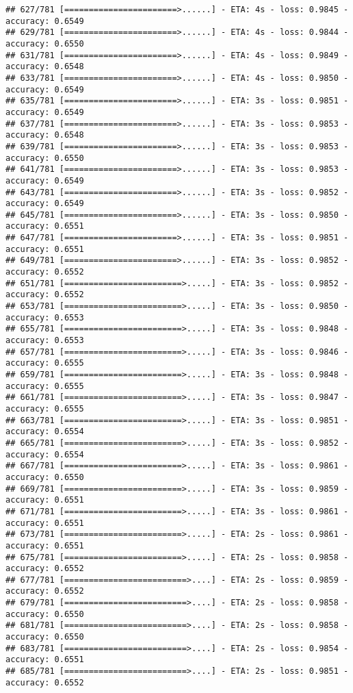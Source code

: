 \documentclass[
]{article}
\begin{document}
\begin{verbatim}
## 627/781 [=======================>......] - ETA: 4s - loss: 0.9845 - accuracy: 0.6549
## 629/781 [=======================>......] - ETA: 4s - loss: 0.9844 - accuracy: 0.6550
## 631/781 [=======================>......] - ETA: 4s - loss: 0.9849 - accuracy: 0.6548
## 633/781 [=======================>......] - ETA: 4s - loss: 0.9850 - accuracy: 0.6549
## 635/781 [=======================>......] - ETA: 3s - loss: 0.9851 - accuracy: 0.6549
## 637/781 [=======================>......] - ETA: 3s - loss: 0.9853 - accuracy: 0.6548
## 639/781 [=======================>......] - ETA: 3s - loss: 0.9853 - accuracy: 0.6550
## 641/781 [=======================>......] - ETA: 3s - loss: 0.9853 - accuracy: 0.6549
## 643/781 [=======================>......] - ETA: 3s - loss: 0.9852 - accuracy: 0.6549
## 645/781 [=======================>......] - ETA: 3s - loss: 0.9850 - accuracy: 0.6551
## 647/781 [=======================>......] - ETA: 3s - loss: 0.9851 - accuracy: 0.6551
## 649/781 [=======================>......] - ETA: 3s - loss: 0.9852 - accuracy: 0.6552
## 651/781 [========================>.....] - ETA: 3s - loss: 0.9852 - accuracy: 0.6552
## 653/781 [========================>.....] - ETA: 3s - loss: 0.9850 - accuracy: 0.6553
## 655/781 [========================>.....] - ETA: 3s - loss: 0.9848 - accuracy: 0.6553
## 657/781 [========================>.....] - ETA: 3s - loss: 0.9846 - accuracy: 0.6555
## 659/781 [========================>.....] - ETA: 3s - loss: 0.9848 - accuracy: 0.6555
## 661/781 [========================>.....] - ETA: 3s - loss: 0.9847 - accuracy: 0.6555
## 663/781 [========================>.....] - ETA: 3s - loss: 0.9851 - accuracy: 0.6554
## 665/781 [========================>.....] - ETA: 3s - loss: 0.9852 - accuracy: 0.6554
## 667/781 [========================>.....] - ETA: 3s - loss: 0.9861 - accuracy: 0.6550
## 669/781 [========================>.....] - ETA: 3s - loss: 0.9859 - accuracy: 0.6551
## 671/781 [========================>.....] - ETA: 3s - loss: 0.9861 - accuracy: 0.6551
## 673/781 [========================>.....] - ETA: 2s - loss: 0.9861 - accuracy: 0.6551
## 675/781 [========================>.....] - ETA: 2s - loss: 0.9858 - accuracy: 0.6552
## 677/781 [=========================>....] - ETA: 2s - loss: 0.9859 - accuracy: 0.6552
## 679/781 [=========================>....] - ETA: 2s - loss: 0.9858 - accuracy: 0.6550
## 681/781 [=========================>....] - ETA: 2s - loss: 0.9858 - accuracy: 0.6550
## 683/781 [=========================>....] - ETA: 2s - loss: 0.9854 - accuracy: 0.6551
## 685/781 [=========================>....] - ETA: 2s - loss: 0.9851 - accuracy: 0.6552

\end{verbatim}
\end{document}
